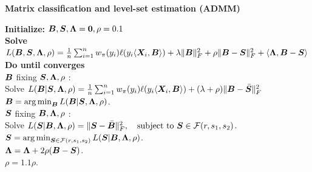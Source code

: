 \documentclass[11pt]{article}
\theoremstyle{definition}
\begin{document}
 \begin{algorithm}[h]
  \caption{{\bf Matrix classification and level-set estimation (ADMM)} } \label{alg:weighted}
{\bf Initialize:} $\bm B, \bm S, \bm{\Lambda}=\mathbf{0}, \rho=0.1$\\
{\bf Solve} $
L(\bm B,\bm S,\bm{\Lambda},\rho)={1\over n}\sum_{i=1}^nw_\pi(y_i)\ell(y_i\langle \bm X_i,\bm B \rangle) + \lambda\lVert\bm B\rVert_F^2+\rho\lVert\bm B-\bm S\rVert_F^2+\langle \bm{\Lambda}, \bm B-\bm S\rangle$\\
{\bf Do until converges}\\[.1cm]
\hspace*{.5cm}{\bf Update} $\bm B$ fixing $\bm S,\bm{\Lambda},\rho$ :\\[.1cm]
\hspace*{.5cm}  Solve $L(\bm B|\bm S,\bm{\Lambda},\rho)={1\over n}\sum_{i=1}^n w_\pi(y_i)\ell(y_i\langle\bm X_i,\bm B\rangle)+(\lambda+\rho)\lVert\bm B-\bar {\bm S}\rVert_F^2$\\
\hspace{.5cm} $\bm B = \operatorname*{arg\,min}_{\bm B} L(\bm B|\bm S,\bm{\Lambda},\rho)$.\\[.2cm]
\hspace*{.5cm}{\bf Update} $\bm S$ fixing $\bm B,\bm{\Lambda},\rho$ :\\[.1cm]
\hspace*{.5cm} Solve  $ L(\bm S|\bm B,\bm{\Lambda},\rho)=\lVert\bm S-\bar {\bm B}\rVert_F^2,\quad \text{subject to }\bm S\in\mathcal{F}(r,s_1,s_2)$.\\
\hspace{.5cm} $\bm S = \operatorname*{arg\,min}_{\bm S\in \mathcal{F}(r,s_1,s_2)}L(\bm S|\bm B,\bm{\Lambda},\rho)$.\\[.1cm]
\hspace*{.5cm}{\bf Update} $\bm{\Lambda}=\bm{\Lambda}+2\rho(\bm B-\bm S)$.\\[.2cm]
\hspace*{.5cm}{\bf Update}  $\rho=1.1\rho$.\\[.2cm]
\end{algorithm}
\end{document}
